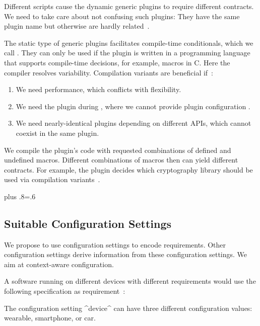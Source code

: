 Different scripts cause the dynamic generic plugins to require different contracts.
We need to take care about not confusing such plugins:
They have the same plugin name but otherwise are hardly related~\cite{raab2016improving}.


The static type of generic plugins facilitates compile-time conditionals, which we call .
They can only be used if the plugin is written in a programming language that supports compile-time decisions, for example, macros in C.
Here the compiler resolves variability.
Compilation variants are beneficial if~\cite{raab2016improving}:

\begin{enumerate}
\item We need performance, which conflicts with flexibility.
\item We need the plugin during , where we cannot provide plugin configuration \cite{raab2015kps}.
\item We need nearly-identical plugins depending on different APIs, which cannot coexist in the same plugin.
\end{enumerate}

We compile the plugin's code with requested combinations of defined and undefined macros.
Different combinations of macros then can yield different contracts.
For example, the plugin  decides which cryptography library should be used via compilation variants~\cite{raab2016improving}.%
{\parfillskip=0pt plus .8\textwidth \emergencystretch=.6\textwidth \par}

\subsection{Suitable Configuration Settings}
\label{sec:backend-suitable}

We propose to use configuration settings to encode requirements.
Other configuration settings derive information from these configuration settings.
We aim at  context-aware configuration.

\begin{example}
A software running on different devices with different requirements would use the following specification as requirement~\cite{raab2016improving}:


The configuration setting ^device^ can have three different configuration values: wearable, smartphone, or car.
\end{example}

